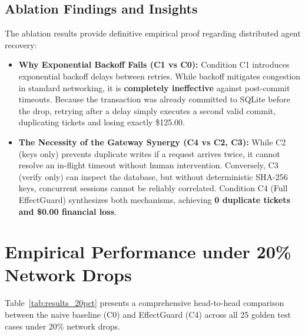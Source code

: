 \subsection{Ablation Findings and Insights}
The ablation results provide definitive empirical proof regarding distributed agent recovery:
\begin{itemize}
    \item \textbf{Why Exponential Backoff Fails (C1 vs C0):} Condition C1 introduces exponential backoff delays between retries. While backoff mitigates congestion in standard networking, it is \textbf{completely ineffective} against post-commit timeouts. Because the transaction was already committed to SQLite before the drop, retrying after a delay simply executes a second valid commit, duplicating tickets and losing exactly \$125.00.
    \item \textbf{The Necessity of the Gateway Synergy (C4 vs C2, C3):} While C2 (keys only) prevents duplicate writes if a request arrives twice, it cannot resolve an in-flight timeout without human intervention. Conversely, C3 (verify only) can inspect the database, but without deterministic SHA-256 keys, concurrent sessions cannot be reliably correlated. Condition C4 (Full EffectGuard) synthesizes both mechanisms, achieving \textbf{0 duplicate tickets and \$0.00 financial loss}.
\end{itemize}

\section{Empirical Performance under 20\% Network Drops}
\label{sec:res_20pct}
Table~\ref{tab:results_20pct} presents a comprehensive head-to-head comparison between the naive baseline (C0) and EffectGuard (C4) across all 25 golden test cases under 20\% network drops.

